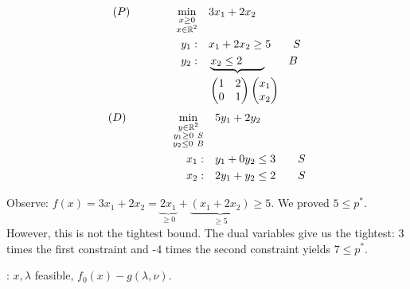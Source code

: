 \documentclass[class=article,crop=false]{standalone}
\begin{document}
\begin{eg}
\begin{align*}
	(P) \qquad \qquad \min_{\substack{x\geq 0\\ x \in \mathbb{R}^{2}}} \quad &3x_1+2x_2\\
						 y_1: \quad &x_1 + 2x_2 \geq 5 \qquad S\\
						 y_2:\quad & \underbrace{x_2 \leq 2 \qquad}\qquad B\\
							   & \begin{pmatrix} 1&2\\0&1 \end{pmatrix} \begin{pmatrix} x_1\\x_2 \end{pmatrix} 
\end{align*}
\begin{align*}
	(D) \qquad \qquad \min_{\substack{y \in \mathbb{R}^{2}\\y_1\geq 0\ S\\ y_2 \leq 0 \ B}} \quad &5y_1+2y_2\\
						 x_1: \quad &y_1 + 0y_2 \leq 3 \qquad S\\
						 x_2:\quad & 2y_1+y_2 \leq 2 \qquad  S
\end{align*}


Observe: $ f(x) = 3x_1 + 2 x_2 = \underbrace{2x_1}_{\geq 0} + \underbrace{(x_1 + 2x_2)}_{\geq 5} \geq 5$. We proved $ 5\leq p^* $. However, this is not the tightest bound. The dual variables give us the tightest: 3 times the first constraint and -4 times the second constraint yields $ 7\leq p^* $.
\end{eg}
: $ x, \lambda$ feasible, $ f_0(x) - g(\lambda,\nu)$.
\end{document}

